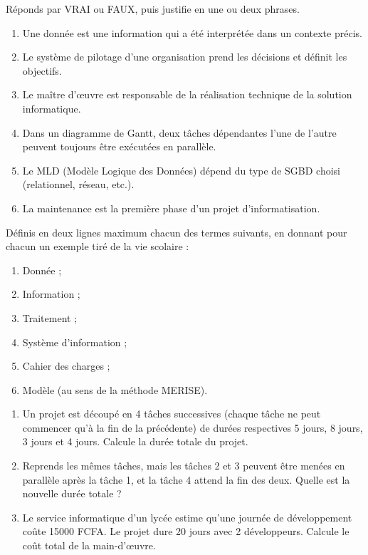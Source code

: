 \documentclass[11pt]{article}
\begin{document}
\begin{exercice}
Réponds par VRAI ou FAUX, puis justifie en une ou deux phrases.
\begin{enumerate}
  \item Une donnée est une information qui a été interprétée dans un contexte précis.
  \item Le système de pilotage d'une organisation prend les décisions et définit les objectifs.
  \item Le maître d'œuvre est responsable de la réalisation technique de la solution informatique.
  \item Dans un diagramme de Gantt, deux tâches dépendantes l'une de l'autre peuvent toujours être exécutées en parallèle.
  \item Le MLD (Modèle Logique des Données) dépend du type de SGBD choisi (relationnel, réseau, etc.).
  \item La maintenance est la première phase d'un projet d'informatisation.
\end{enumerate}
\end{exercice}

\begin{exercice}
Définis en deux lignes maximum chacun des termes suivants, en donnant pour chacun un exemple tiré de la vie scolaire :
\begin{enumerate}
  \item Donnée ;
  \item Information ;
  \item Traitement ;
  \item Système d'information ;
  \item Cahier des charges ;
  \item Modèle (au sens de la méthode MERISE).
\end{enumerate}
\end{exercice}

\begin{exercice}
\begin{enumerate}
  \item Un projet est découpé en 4 tâches successives (chaque tâche ne peut commencer qu'à la fin de la précédente) de durées respectives 5 jours, 8 jours, 3 jours et 4 jours. Calcule la durée totale du projet.
  \item Reprends les mêmes tâches, mais les tâches 2 et 3 peuvent être menées en parallèle après la tâche 1, et la tâche 4 attend la fin des deux. Quelle est la nouvelle durée totale ?
  \item Le service informatique d'un lycée estime qu'une journée de développement coûte \num{15000} FCFA. Le projet dure 20 jours avec 2 développeurs. Calcule le coût total de la main-d'œuvre.
\end{enumerate}
\end{exercice}
\end{document}
